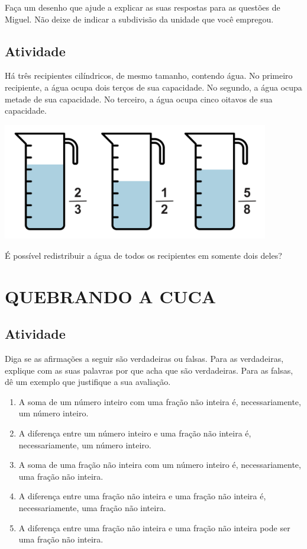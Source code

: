 Faça um desenho que ajude a explicar as suas respostas para as questões de Miguel. Não deixe de indicar a subdivisão da unidade que você empregou.

\subsection{Atividade}

Há três recipientes cilíndricos, de mesmo tamanho, contendo água. No primeiro recipiente, a água ocupa dois terços de sua capacidade. No segundo, a água ocupa metade de sua capacidade. No terceiro, a água ocupa cinco oitavos de sua capacidade.  
\begin{center}  
  \includegraphics[width=330pt, keepaspectratio]{..//media/cap5/secoes/PNGs_licao_05/ativ14_fig01.png}
\end{center}

É possível redistribuir a água de todos os recipientes em somente dois deles?

\section{QUEBRANDO A CUCA }

\subsection{Atividade}

Diga se as afirmações a seguir são verdadeiras ou falsas. Para as verdadeiras, explique com as suas palavras por que acha que são verdadeiras. Para as falsas, dê um exemplo que justifique a sua avaliação.
\begin{enumerate} [\quad a)] %
  \item     A soma de um número inteiro com uma fração não inteira é, necessariamente, um número inteiro.
  \item     A diferença entre um número inteiro e uma fração não inteira é, necessariamente, um número inteiro.
  \item     A soma de uma fração não inteira com um número inteiro é, necessariamente, uma fração não inteira.
  \item     A diferença entre uma fração não inteira e uma fração não inteira é, necessariamente, uma fração não inteira.
  \item     A diferença entre uma fração não inteira e uma fração não inteira pode ser uma fração não inteira.
\end{enumerate} %

